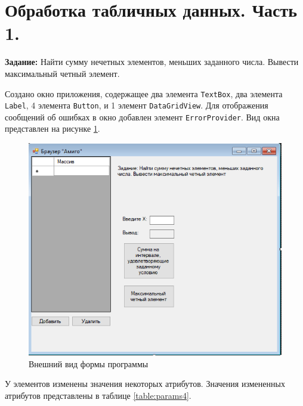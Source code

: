 \section{Обработка табличных данных. Часть 1.}

\textbf{Задание:} Найти сумму нечетных элементов, меньших заданного числа. 
Вывести максимальный четный элемент. 

Создано окно приложения, содержащее два элемента \verb|TextBox|, два элемента \verb|Label|, 
4 элемента \verb|Button|, и 1 элемент \verb|DataGridView|. 
Для отображения сообщений об ошибках в окно добавлен элемент \verb|ErrorProvider|. 
Вид окна представлен на рисунке \ref{fig:task4_form}.
\begin{figure}[H]
    \centering
    \includegraphics{task4/form.png}
    \caption{Внешний вид формы программы}
    \label{fig:task4_form}
\end{figure}
У элементов изменены значения некоторых атрибутов. 
Значения измененных атрибутов представлены в таблице \ref{table:params4}.

